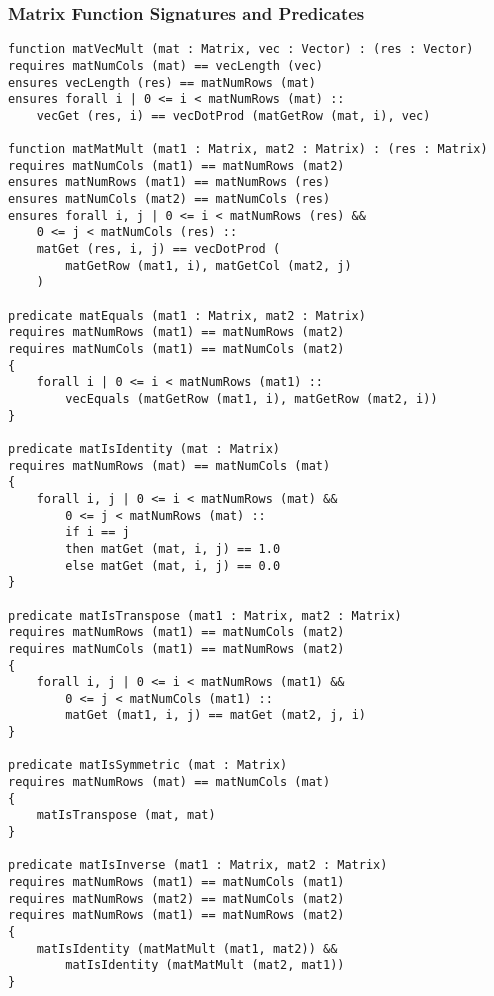 \documentclass[12pt]{article}
\begin{document}
\subsubsection{Matrix Function Signatures and Predicates}
\label{sec:matrixsigs}
\begin{verbatim}
function matVecMult (mat : Matrix, vec : Vector) : (res : Vector)
requires matNumCols (mat) == vecLength (vec)
ensures vecLength (res) == matNumRows (mat)
ensures forall i | 0 <= i < matNumRows (mat) :: 
    vecGet (res, i) == vecDotProd (matGetRow (mat, i), vec)

function matMatMult (mat1 : Matrix, mat2 : Matrix) : (res : Matrix)
requires matNumCols (mat1) == matNumRows (mat2)
ensures matNumRows (mat1) == matNumRows (res)
ensures matNumCols (mat2) == matNumCols (res)
ensures forall i, j | 0 <= i < matNumRows (res) && 
    0 <= j < matNumCols (res) ::
    matGet (res, i, j) == vecDotProd (
        matGetRow (mat1, i), matGetCol (mat2, j)
    )

predicate matEquals (mat1 : Matrix, mat2 : Matrix)
requires matNumRows (mat1) == matNumRows (mat2)
requires matNumCols (mat1) == matNumCols (mat2)
{
    forall i | 0 <= i < matNumRows (mat1) ::
        vecEquals (matGetRow (mat1, i), matGetRow (mat2, i))
}

predicate matIsIdentity (mat : Matrix)
requires matNumRows (mat) == matNumCols (mat)
{
    forall i, j | 0 <= i < matNumRows (mat) && 
        0 <= j < matNumRows (mat) ::
        if i == j
        then matGet (mat, i, j) == 1.0 
        else matGet (mat, i, j) == 0.0
}

predicate matIsTranspose (mat1 : Matrix, mat2 : Matrix)
requires matNumRows (mat1) == matNumCols (mat2)
requires matNumCols (mat1) == matNumRows (mat2)
{
    forall i, j | 0 <= i < matNumRows (mat1) &&
        0 <= j < matNumCols (mat1) ::
        matGet (mat1, i, j) == matGet (mat2, j, i)
}

predicate matIsSymmetric (mat : Matrix)
requires matNumRows (mat) == matNumCols (mat)
{
    matIsTranspose (mat, mat)
}

predicate matIsInverse (mat1 : Matrix, mat2 : Matrix)
requires matNumRows (mat1) == matNumCols (mat1)
requires matNumRows (mat2) == matNumCols (mat2)
requires matNumRows (mat1) == matNumRows (mat2)
{
    matIsIdentity (matMatMult (mat1, mat2)) && 
        matIsIdentity (matMatMult (mat2, mat1))
}
\end{verbatim}
\end{document}
